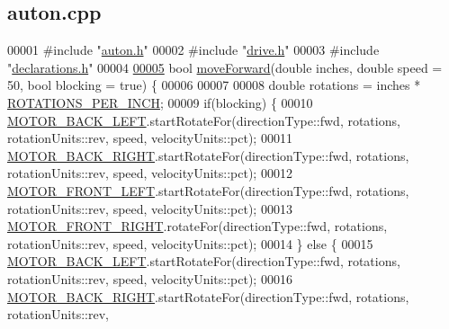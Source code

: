 \hypertarget{auton_8cpp_source}{}\subsection{auton.\+cpp}
\label{auton_8cpp_source}

\begin{DoxyCode}
00001 \textcolor{preprocessor}{#include "\mbox{\hyperlink{auton_8h}{auton.h}}"}
00002 \textcolor{preprocessor}{#include "\mbox{\hyperlink{drive_8h}{drive.h}}"}
00003 \textcolor{preprocessor}{#include "\mbox{\hyperlink{declarations_8h}{declarations.h}}"}
00004 
\mbox{\hyperlink{auton_8cpp_af5833bec4b862d3da7fc3700ca7d2a6b_af5833bec4b862d3da7fc3700ca7d2a6b}{00005}} \textcolor{keywordtype}{bool} \mbox{\hyperlink{auton_8cpp_af5833bec4b862d3da7fc3700ca7d2a6b_af5833bec4b862d3da7fc3700ca7d2a6b}{moveForward}}(\textcolor{keywordtype}{double} inches, \textcolor{keywordtype}{double} speed = 50, \textcolor{keywordtype}{bool} blocking = \textcolor{keyword}{true}) \{
00006 
00007 
00008   \textcolor{keywordtype}{double} rotations = inches * \mbox{\hyperlink{declarations_8h_acfdb8ffd7cd602577173adb1c9c0f330_acfdb8ffd7cd602577173adb1c9c0f330}{ROTATIONS\_PER\_INCH}};
00009   \textcolor{keywordflow}{if}(blocking) \{
00010     \mbox{\hyperlink{declarations_8h_ab24214b642128d0f3cb67e9b12e7d4fb_ab24214b642128d0f3cb67e9b12e7d4fb}{MOTOR\_BACK\_LEFT}}.startRotateFor(directionType::fwd, rotations, rotationUnits::rev, speed,
       velocityUnits::pct);
00011     \mbox{\hyperlink{declarations_8h_adece81dedf91c2893ba42dc05135a575_adece81dedf91c2893ba42dc05135a575}{MOTOR\_BACK\_RIGHT}}.startRotateFor(directionType::fwd, rotations, rotationUnits::rev, 
      speed, velocityUnits::pct);
00012     \mbox{\hyperlink{declarations_8h_a8c6f6315caf1d81bf4d4d113d0f7bffc_a8c6f6315caf1d81bf4d4d113d0f7bffc}{MOTOR\_FRONT\_LEFT}}.startRotateFor(directionType::fwd, rotations, rotationUnits::rev, 
      speed, velocityUnits::pct);
00013     \mbox{\hyperlink{declarations_8h_ad6a9ea3d338421c5d709c32ae1aa42d8_ad6a9ea3d338421c5d709c32ae1aa42d8}{MOTOR\_FRONT\_RIGHT}}.rotateFor(directionType::fwd, rotations, rotationUnits::rev, speed, 
      velocityUnits::pct);
00014   \} \textcolor{keywordflow}{else} \{
00015     \mbox{\hyperlink{declarations_8h_ab24214b642128d0f3cb67e9b12e7d4fb_ab24214b642128d0f3cb67e9b12e7d4fb}{MOTOR\_BACK\_LEFT}}.startRotateFor(directionType::fwd, rotations, rotationUnits::rev, speed,
       velocityUnits::pct);
00016     \mbox{\hyperlink{declarations_8h_adece81dedf91c2893ba42dc05135a575_adece81dedf91c2893ba42dc05135a575}{MOTOR\_BACK\_RIGHT}}.startRotateFor(directionType::fwd, rotations, rotationUnits::rev, 

\end{DoxyCode}
